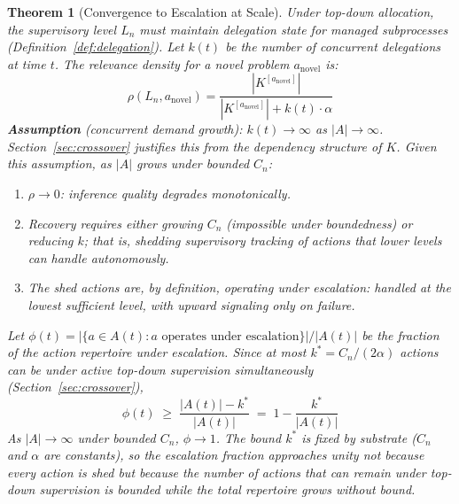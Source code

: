 \documentclass[11pt]{article}
\newtheorem{theorem}{Theorem}
\theoremstyle{definition}
\begin{document}
\begin{theorem}[Convergence to Escalation at Scale]
\label{thm:topdown}
Under top-down allocation, the supervisory level $L_n$ must maintain
delegation state for managed subprocesses
(Definition~\ref{def:delegation}). Let $k(t)$ be the number of
concurrent delegations at time $t$. The relevance density for a novel
problem $a_{\mathrm{novel}}$ is:
\[
\rho(L_n, a_{\mathrm{novel}}) =
\frac{|K^{[a_{\mathrm{novel}}]}|}{|K^{[a_{\mathrm{novel}}]}| + k(t)
\cdot \alpha}
\]
\textbf{Assumption} (concurrent demand growth): $k(t) \to \infty$ as
$|A| \to \infty$. Section~\ref{sec:crossover} justifies this from the
dependency structure of $K$. Given this assumption, as $|A|$ grows
under bounded $C_n$:
\begin{enumerate}
\item[(i)] $\rho \to 0$: inference quality degrades monotonically.
\item[(ii)] Recovery requires either growing $C_n$ (impossible under
   boundedness) or reducing $k$; that is, shedding supervisory
   tracking of actions that lower levels can handle autonomously.
\item[(iii)] The shed actions are, by definition, operating under
   escalation: handled at the lowest sufficient level, with upward
   signaling only on failure.
\end{enumerate}
Let $\phi(t) = |\{a \in A(t) : a \text{ operates under escalation}\}|
/ |A(t)|$ be the fraction of the action repertoire under escalation.
Since at most $k^* = C_n / (2\alpha)$ actions can be under active
top-down supervision simultaneously (Section~\ref{sec:crossover}),
\[
\phi(t) \;\geq\; \frac{|A(t)| - k^*}{|A(t)|} \;=\; 1 - \frac{k^*}{|A(t)|}
\]
As $|A| \to \infty$ under bounded $C_n$, $\phi \to 1$. The bound
$k^*$ is fixed by substrate ($C_n$ and $\alpha$ are constants), so
the escalation fraction approaches unity not because every action is
shed but because the number of actions that \emph{can} remain under
top-down supervision is bounded while the total repertoire grows
without bound.
\end{theorem}
\end{document}
